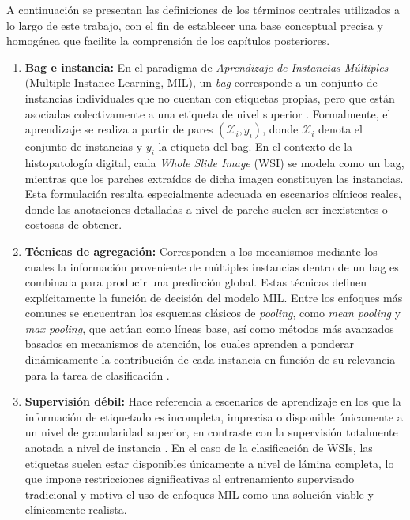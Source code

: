 
\noindent
A continuación se presentan las definiciones de los términos centrales utilizados a lo largo de este trabajo, con el fin de establecer una base conceptual precisa y homogénea que facilite la comprensión de los capítulos posteriores.

\begin{enumerate}

    \item \textbf{Bag e instancia:} En el paradigma de \textit{Aprendizaje de Instancias Múltiples} (Multiple Instance Learning, MIL), un \textit{bag} corresponde a un conjunto de instancias individuales que no cuentan con etiquetas propias, pero que están asociadas colectivamente a una etiqueta de nivel superior \cite{carbonneau2018multiple}. Formalmente, el aprendizaje se realiza a partir de pares $(\mathcal{X}_i, y_i)$, donde $\mathcal{X}_i$ denota el conjunto de instancias y $y_i$ la etiqueta del bag. En el contexto de la histopatología digital, cada \textit{Whole Slide Image} (WSI) se modela como un bag, mientras que los parches extraídos de dicha imagen constituyen las instancias. Esta formulación resulta especialmente adecuada en escenarios clínicos reales, donde las anotaciones detalladas a nivel de parche suelen ser inexistentes o costosas de obtener.

    \item \textbf{Técnicas de agregación:} Corresponden a los mecanismos mediante los cuales la información proveniente de múltiples instancias dentro de un bag es combinada para producir una predicción global. Estas técnicas definen explícitamente la función de decisión del modelo MIL. Entre los enfoques más comunes se encuentran los esquemas clásicos de \emph{pooling}, como \emph{mean pooling} y \emph{max pooling}, que actúan como líneas base, así como métodos más avanzados basados en mecanismos de atención, los cuales aprenden a ponderar dinámicamente la contribución de cada instancia en función de su relevancia para la tarea de clasificación \cite{ilse2018attention}\cite{li2021dual} \cite{GADERMAYR2024102337}.

    \item \textbf{Supervisión débil:} Hace referencia a escenarios de aprendizaje en los que la información de etiquetado es incompleta, imprecisa o disponible únicamente a un nivel de granularidad superior, en contraste con la supervisión totalmente anotada a nivel de instancia \cite{campanella2019clinical} \cite{zhou2018brief} \cite{GADERMAYR2024102337}. En el caso de la clasificación de WSIs, las etiquetas suelen estar disponibles únicamente a nivel de lámina completa, lo que impone restricciones significativas al entrenamiento supervisado tradicional y motiva el uso de enfoques MIL como una solución viable y clínicamente realista.


\end{enumerate}
